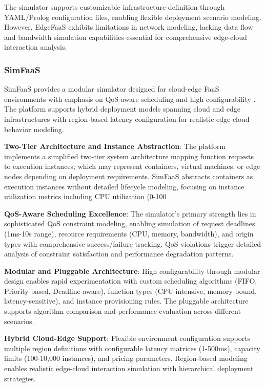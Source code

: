 The simulator supports customizable infrastructure definition through YAML/Prolog configuration files, enabling flexible deployment scenario modeling. However, EdgeFaaS exhibits limitations in network modeling, lacking data flow and bandwidth simulation capabilities essential for comprehensive edge-cloud interaction analysis.



\subsubsection{SimFaaS}

SimFaaS provides a modular simulator designed for cloud-edge FaaS environments with emphasis on QoS-aware scheduling and high configurability \cite{mahmoudi2021simfaas}. The platform supports hybrid deployment models spanning cloud and edge infrastructures with region-based latency configuration for realistic edge-cloud behavior modeling.

\textbf{Two-Tier Architecture and Instance Abstraction}: The platform implements a simplified two-tier system architecture mapping function requests to execution instances, which may represent containers, virtual machines, or edge nodes depending on deployment requirements. SimFaaS abstracts containers as execution instances without detailed lifecycle modeling, focusing on instance utilization metrics including CPU utilization (0-100%

\textbf{QoS-Aware Scheduling Excellence}: The simulator's primary strength lies in sophisticated QoS constraint modeling, enabling simulation of request deadlines (1ms-10s range), resource requirements (CPU, memory, bandwidth), and origin types with comprehensive success/failure tracking. QoS violations trigger detailed analysis of constraint satisfaction and performance degradation patterns.

\textbf{Modular and Pluggable Architecture}: High configurability through modular design enables rapid experimentation with custom scheduling algorithms (FIFO, Priority-based, Deadline-aware), function types (CPU-intensive, memory-bound, latency-sensitive), and instance provisioning rules. The pluggable architecture supports algorithm comparison and performance evaluation across different scenarios.

\textbf{Hybrid Cloud-Edge Support}: Flexible environment configuration supports multiple region definitions with configurable latency matrices (1-500ms), capacity limits (100-10,000 instances), and pricing parameters. Region-based modeling enables realistic edge-cloud interaction simulation with hierarchical deployment strategies.

